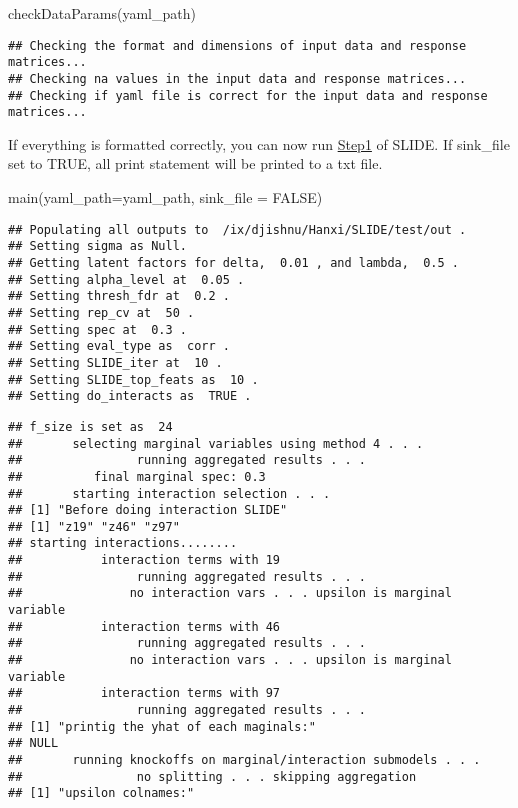 \documentclass[
]{article}
\newenvironment{Shaded}{\begin{snugshade}}{\end{snugshade}}
\newcommand{\AttributeTok}[1]{\textcolor[rgb]{0.77,0.63,0.00}{#1}}
\newcommand{\ConstantTok}[1]{\textcolor[rgb]{0.00,0.00,0.00}{#1}}
\newcommand{\FunctionTok}[1]{\textcolor[rgb]{0.00,0.00,0.00}{#1}}
\newcommand{\NormalTok}[1]{#1}
\begin{document}
\begin{Shaded}
\begin{Highlighting}[]
\FunctionTok{checkDataParams}\NormalTok{(yaml\_path)}
\end{Highlighting}
\end{Shaded}

\begin{verbatim}
## Checking the format and dimensions of input data and response matrices... 
## Checking na values in the input data and response matrices... 
## Checking if yaml file is correct for the input data and response matrices...
\end{verbatim}

If everything is formatted correctly, you can now run \uline{Step1} of
SLIDE. If sink\_file set to TRUE, all print statement will be printed to
a txt file.

\begin{Shaded}
\begin{Highlighting}[]
\FunctionTok{main}\NormalTok{(}\AttributeTok{yaml\_path=}\NormalTok{yaml\_path, }\AttributeTok{sink\_file =} \ConstantTok{FALSE}\NormalTok{)}
\end{Highlighting}
\end{Shaded}

\begin{verbatim}
## Populating all outputs to  /ix/djishnu/Hanxi/SLIDE/test/out .
## Setting sigma as Null.
## Getting latent factors for delta,  0.01 , and lambda,  0.5 . 
## Setting alpha_level at  0.05 .
## Setting thresh_fdr at  0.2 .
## Setting rep_cv at  50 .
## Setting spec at  0.3 .
## Setting eval_type as  corr .
## Setting SLIDE_iter at  10 .
## Setting SLIDE_top_feats as  10 .
## Setting do_interacts as  TRUE .
\end{verbatim}

\begin{verbatim}
## f_size is set as  24 
##       selecting marginal variables using method 4 . . . 
##                running aggregated results . . . 
##          final marginal spec: 0.3
##       starting interaction selection . . . 
## [1] "Before doing interaction SLIDE"
## [1] "z19" "z46" "z97"
## starting interactions........ 
##           interaction terms with 19 
##                running aggregated results . . . 
##               no interaction vars . . . upsilon is marginal variable 
##           interaction terms with 46 
##                running aggregated results . . . 
##               no interaction vars . . . upsilon is marginal variable 
##           interaction terms with 97 
##                running aggregated results . . . 
## [1] "printig the yhat of each maginals:"
## NULL
##       running knockoffs on marginal/interaction submodels . . . 
##                no splitting . . . skipping aggregation 
## [1] "upsilon colnames:"
\end{verbatim}
\end{document}
